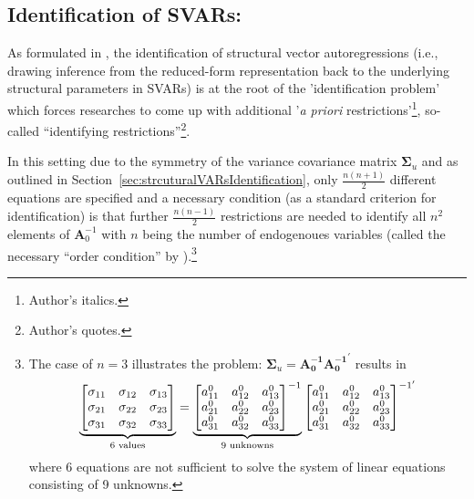 \documentclass[a4paper,11pt,listof=nochaptergap,oneside,pointednumbers,bibtotoc,bigheadings,liststotoc,hidelinks]{scrbook}
\theoremstyle{mysatz}
\theoremstyle{mydefinition}
\theoremstyle{mytheorem}
\theoremstyle{mybemerkung}
\newcommand{\vect}[1]{\boldsymbol{\mathbf{#1}}}
\begin{document}
	
	
\subsection{Identification of SVARs: \citet{rubioetal:10}}
\label{sec:observationalEquivalence}
As formulated in \citet{rubioetal:10}, the identification of structural vector autoregressions (i.e., drawing inference from the reduced-form representation back to the underlying structural parameters in SVARs) is at the root of the 'identification problem' which forces researches to come up with additional '\textit{a priori} restrictions'\footnote{Author's italics.}, so-called ``identifying restrictions''\footnote{Author's quotes.}.

In this setting due to the symmetry of the variance covariance matrix $\vect{\Sigma}_u$ and as outlined in Section~\ref{sec:strcuturalVARsIdentification}, only $\frac{n(n+1)}{2}$ different equations are specified and a necessary condition (as a standard criterion for identification) is that further $\frac{n(n-1)}{2}$ restrictions are needed to identify all $n^2$ elements of $\vect{A}_0^{-1}$ with $n$ being the number of endogenoues variables (called the necessary ``order condition'' by \citealp{rothenberg:71}).\footnote{The case of $n=3$ illustrates the problem: $\vect{\Sigma}_u = \vect{A_{0}^{-1}} \vect{A_{0}^{-1}}^'$ results in $$		
		\underbrace{%
		\begin{bmatrix}
    		\sigma_{11} & \sigma_{12} & \sigma_{13} \\
		\sigma_{21} & \sigma_{22} & \sigma_{23} \\
		\sigma_{31} & \sigma_{32} & \sigma_{33}
 		\end{bmatrix}
}_{\text{6 values}} = \underbrace{%
		\begin{bmatrix}
    		a_{11}^0 & a_{12}^0 & a_{13}^0 \\
		a_{21}^0 & a_{22}^0 & a_{23}^0 \\
		a_{31}^0 & a_{32}^0 & a_{33}^0
 		\end{bmatrix}^{-1}
}_{\text{9 unknowns}}
\begin{bmatrix}
    		a_{11}^0 & a_{12}^0 & a_{13}^0 \\
		a_{21}^0 & a_{22}^0 & a_{23}^0 \\
		a_{31}^0 & a_{32}^0 & a_{33}^0
 		\end{bmatrix}^{{-1}'}$$ 
		where 6 equations are not sufficient to solve the system of linear equations consisting of 9 unknowns.}
		
\end{document}
